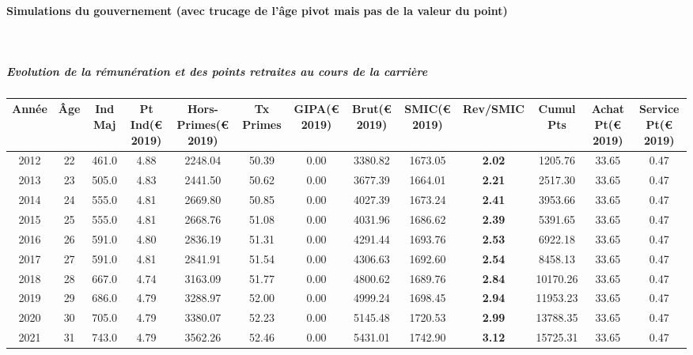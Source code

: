 \newpage 
 
\paragraph{Simulations du gouvernement (avec trucage de l'âge pivot mais pas de la valeur du point)}  ~\\ 
 
\subparagraph{Evolution de la rémunération et des points retraites au cours de la carrière} 
 
{ \scriptsize \begin{center} 
\begin{tabular}[htb]{|c|c||c|c|c|c|c|c||c|c||c|c|c||} 
\hline 
 Année &  Âge &  Ind Maj &  Pt Ind(\euro{} 2019) &   Hors-Primes(\euro{} 2019) &  Tx Primes &  GIPA(\euro{} 2019) &  Brut(\euro{} 2019) &  SMIC(\euro{} 2019) &  Rev/SMIC &  Cumul Pts &  Achat Pt(\euro{} 2019) &  Service Pt(\euro{} 2019) \\ 
\hline \hline 
 2012 &  22 &  461.0 &  4.88 &  2248.04 &  50.39 &  0.00 &  3380.82 &  1673.05 &  {\bf 2.02} &  1205.76 &  33.65 &  0.47 \\ 
\hline 
 2013 &  23 &  505.0 &  4.83 &  2441.50 &  50.62 &  0.00 &  3677.39 &  1664.01 &  {\bf 2.21} &  2517.30 &  33.65 &  0.47 \\ 
\hline 
 2014 &  24 &  555.0 &  4.81 &  2669.80 &  50.85 &  0.00 &  4027.39 &  1673.24 &  {\bf 2.41} &  3953.66 &  33.65 &  0.47 \\ 
\hline 
 2015 &  25 &  555.0 &  4.81 &  2668.76 &  51.08 &  0.00 &  4031.96 &  1686.62 &  {\bf 2.39} &  5391.65 &  33.65 &  0.47 \\ 
\hline 
 2016 &  26 &  591.0 &  4.80 &  2836.19 &  51.31 &  0.00 &  4291.44 &  1693.76 &  {\bf 2.53} &  6922.18 &  33.65 &  0.47 \\ 
\hline 
 2017 &  27 &  591.0 &  4.81 &  2841.91 &  51.54 &  0.00 &  4306.63 &  1692.60 &  {\bf 2.54} &  8458.13 &  33.65 &  0.47 \\ 
\hline 
 2018 &  28 &  667.0 &  4.74 &  3163.09 &  51.77 &  0.00 &  4800.62 &  1689.76 &  {\bf 2.84} &  10170.26 &  33.65 &  0.47 \\ 
\hline 
 2019 &  29 &  686.0 &  4.79 &  3288.97 &  52.00 &  0.00 &  4999.24 &  1698.45 &  {\bf 2.94} &  11953.23 &  33.65 &  0.47 \\ 
\hline 
 2020 &  30 &  705.0 &  4.79 &  3380.07 &  52.23 &  0.00 &  5145.48 &  1720.53 &  {\bf 2.99} &  13788.35 &  33.65 &  0.47 \\ 
\hline 
 2021 &  31 &  743.0 &  4.79 &  3562.26 &  52.46 &  0.00 &  5431.01 &  1742.90 &  {\bf 3.12} &  15725.31 &  33.65 &  0.47 \\ 

\end{tabular}
\end{center}}

